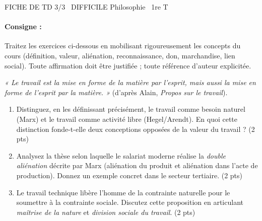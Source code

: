 \documentclass[11pt]{article}
\begin{document}
\begin{tcolorbox}[enhanced,colback=popink,colframe=popink,arc=10pt,boxrule=0pt,left=12pt,right=12pt,top=9pt,bottom=9pt]
{\color{white}\popxbold\small FICHE DE TD 3/3 \textbullet\ DIFFICILE \hfill Philosophie \textbullet\ 1re T\par}
\end{tcolorbox}
\vspace{4pt}
\paragraph{Consigne :} Traitez les exercices ci-dessous en mobilisant rigoureusement les concepts du cours (définition, valeur, aliénation, reconnaissance, don, marchandise, lien social). Toute affirmation doit être justifiée ; toute référence d'auteur explicitée.

\begin{exercice}
\emph{« Le travail est la mise en forme de la matière par l'esprit, mais aussi la mise en forme de l'esprit par la matière. »} (d'après Alain, \emph{Propos sur le travail}). 
\begin{enumerate}
    \item Distinguez, en les définissant précisément, le travail comme \og besoin naturel \fg (Marx) et le travail comme \og activité libre \fg (Hegel/Arendt). En quoi cette distinction fonde-t-elle deux conceptions opposées de la valeur du travail ? \hfill (2 pts)
    \item Analysez la thèse selon laquelle le salariat moderne réalise la \emph{double aliénation} décrite par Marx (aliénation du produit et aliénation dans l'acte de production). Donnez un exemple concret dans le secteur tertiaire. \hfill (2 pts)
    \item \og Le travail technique libère l'homme de la contrainte naturelle pour le soumettre à la contrainte sociale. \fg Discutez cette proposition en articulant \emph{maîtrise de la nature} et \emph{division sociale du travail}. \hfill (2 pts)
\end{enumerate}
\end{exercice}
\end{document}
